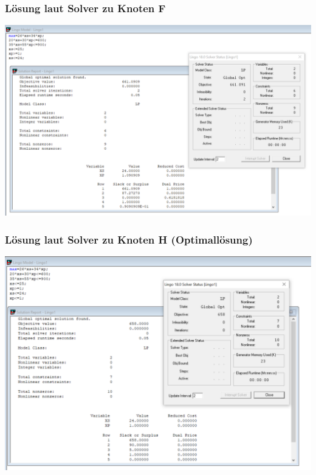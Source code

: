 \documentclass[a4paper,11pt]{article}
\begin{document}
\subsubsection*{Lösung laut Solver zu Knoten F}
\begin{centering}
	\includegraphics[width=1\linewidth]{src/blatt_5_aufgabe_2_teilaufgabe_b_knoten_f_loesung_solver.png}
\end{centering}

\subsubsection*{Lösung laut Solver zu Knoten H (Optimallösung)}
\begin{centering}
	\includegraphics[width=1\linewidth]{src/blatt_5_aufgabe_2_teilaufgabe_b_knoten_h_loesung_solver.png}
\end{centering}
\end{document}
